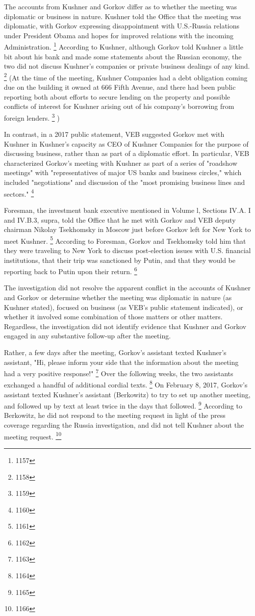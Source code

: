The accounts from Kushner and Gorkov differ as to whether the meeting was diplomatic or business in nature.
Kushner told the Office that the meeting was diplomatic, with Gorkov expressing disappointment with U.S.-Russia relations under President Obama and hopes for improved relations with the incoming Administration.%
\footnote{1157}
According to Kushner, although Gorkov told Kushner a little bit about his bank and made some statements about the Russian economy, the two did not discuss Kushner's companies or private business dealings of any kind.%
\footnote{1158}
(At the time of the meeting, Kushner Companies had a debt obligation coming due on the building it owned at 666 Fifth Avenue, and there had been public reporting both about efforts to secure lending on the property and possible conflicts of interest for Kushner arising out of his company's borrowing from foreign lenders.%
\footnote{1159}
)

In contrast, in a 2017 public statement, VEB suggested Gorkov met with Kushner in Kushner's capacity as CEO of Kushner Companies for the purpose of discussing business, rather than as part of a diplomatic effort.
In particular, VEB characterized Gorkov's meeting with Kushner as part of a series of "roadshow meetings" with "representatives of major US banks and business circles," which included "negotiations" and discussion of the "most promising business lines and sectors."%
\footnote{1160}

Foresman, the investment bank executive mentioned in Volume l, Sections IV.A. I and IV.B.3, supra, told the Office that he met with Gorkov and VEB deputy chairman Nikolay Tsekhomsky in Moscow just before Gorkov left for New York to meet Kushner.%
\footnote{1161}
According to Foresman, Gorkov and Tsekhomsky told him that they were traveling to New York to discuss post-election issues with U.S. financial institutions, that their trip was sanctioned by Putin, and that they would be reporting back to Putin upon their return.%
\footnote{1162}

The investigation did not resolve the apparent conflict in the accounts of Kushner and Gorkov or determine whether the meeting was diplomatic in nature (as Kushner stated), focused on business (as VEB's public statement indicated), or whether it involved some combination of those matters or other matters.
Regardless, the investigation did not identify evidence that Kushner and Gorkov engaged in any substantive follow-up after the meeting.

Rather, a few days after the meeting, Gorkov's assistant texted Kushner's assistant, "Hi, please inform your side that the information about the meeting had a very positive response!"%
\footnote{1163}
Over the following weeks, the two assistants exchanged a handful of additional cordial texts.%
\footnote{1164}
On February 8, 2017, Gorkov's assistant texted Kushner's assistant (Berkowitz) to try to set up another meeting, and followed up by text at least twice in the days that followed.%
\footnote{1165}
According to Berkowitz, he did not respond to the meeting request in light of the press coverage regarding the Russia investigation, and did not tell Kushner about the meeting request.%
\footnote{1166}

